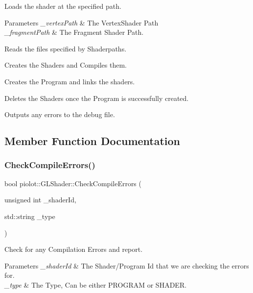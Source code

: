 Loads the shader at the specified path. 


\begin{DoxyParams}{Parameters}
{\em \+\_\+vertex\+Path} & The Vertex\+Shader Path \\
\hline
{\em \+\_\+fragment\+Path} & The Fragment Shader Path.\\
\hline
\end{DoxyParams}

\begin{DoxyItemize}
\item Reads the files specified by Shaderpaths.
\item Creates the Shaders and Compiles them.
\item Creates the Program and links the shaders.
\item Deletes the Shaders once the Program is successfully created.
\item Outputs any errors to the debug file. 
\end{DoxyItemize}

\subsection{Member Function Documentation}
\mbox{\label{classpiolot_1_1_g_l_shader_ab2badc2b316c708bf6ea7a4ff39db254}} 
\subsubsection{\texorpdfstring{Check\+Compile\+Errors()}{CheckCompileErrors()}}
{\footnotesize\ttfamily bool piolot\+::\+G\+L\+Shader\+::\+Check\+Compile\+Errors (\begin{DoxyParamCaption}\item[{unsigned int}]{\+\_\+shader\+Id,  }\item[{std\+::string}]{\+\_\+type }\end{DoxyParamCaption})}



Check for any Compilation Errors and report. 


\begin{DoxyParams}{Parameters}
{\em \+\_\+shader\+Id} & The Shader/\+Program Id that we are checking the errors for. \\
\hline
{\em \+\_\+type} & The Type, Can be either P\+R\+O\+G\+R\+AM or S\+H\+A\+D\+ER. \\
\hline
\end{DoxyParams}
\mbox{\label{classpiolot_1_1_g_l_shader_a8f3349b73adbb3f7d85b847ffc39d0f3}} 

